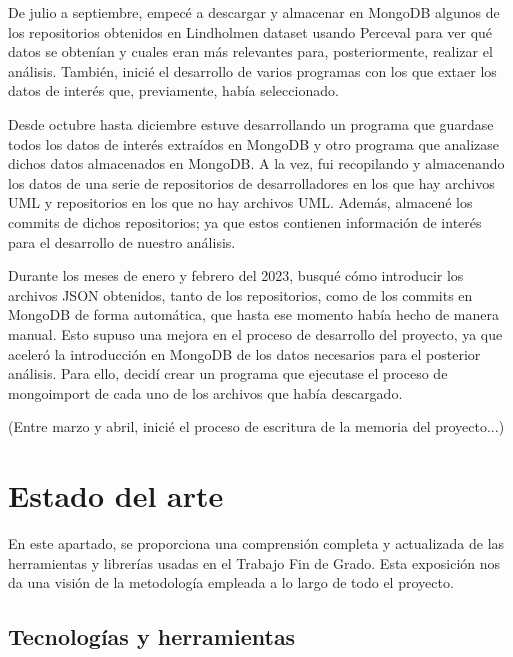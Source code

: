 \documentclass[a4paper, 12pt]{book}
\begin{document}
De julio a septiembre, empecé a descargar y almacenar en MongoDB algunos de los repositorios obtenidos en Lindholmen dataset usando Perceval para ver qué datos se obtenían y cuales eran más relevantes para, posteriormente, realizar el análisis.
También, inicié el desarrollo de varios programas con los que extaer los datos de interés que, previamente, había seleccionado.


Desde octubre hasta diciembre estuve desarrollando un programa que guardase todos los datos de interés extraídos en MongoDB y otro programa que analizase dichos datos almacenados en MongoDB.
A la vez, fui recopilando y almacenando los datos de una serie de repositorios de desarrolladores en los que hay archivos UML y repositorios en los que no hay archivos UML.
Además, almacené los commits de dichos repositorios; ya que estos contienen información de interés para el desarrollo de nuestro análisis.


Durante los meses de enero y febrero del 2023, busqué cómo introducir los archivos JSON obtenidos, tanto de los repositorios, como de los commits en MongoDB de forma automática, que hasta ese momento había hecho de manera manual.
Esto supuso una mejora en el proceso de desarrollo del proyecto, ya que aceleró la introducción en MongoDB de los datos necesarios para el posterior análisis.
Para ello, decidí crear un programa que ejecutase el proceso de mongoimport de cada uno de los archivos que había descargado. 


(Entre marzo y abril, inicié el proceso de escritura de la memoria del proyecto...)



\cleardoublepage
\chapter{Estado del arte}
\label{chap:estado}

En este apartado, se proporciona una comprensión completa y actualizada de las herramientas y librerías usadas en el Trabajo Fin de Grado.
Esta exposición nos da una visión de la metodología empleada a lo largo de todo el proyecto.

\section{Tecnologías y herramientas} %
\label{sec:tecnologías y herramienta}
\end{document}
